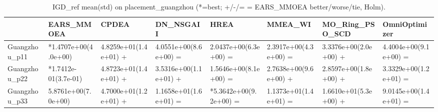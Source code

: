 \begin{table}[t]
\centering
\caption{IGD_ref mean(std) on placement_guangzhou (*=best; +/-/= = EARS_MMOEA better/worse/tie, Holm).}
\label{tab:placement_guangzhou_IGD_ref}
\begin{tabular}{llllllll}
\toprule
 & EARS\_MMOEA & CPDEA & DN\_NSGAII & HREA & MMEA\_WI & MO\_Ring\_PSO\_SCD & OmniOptimizer \\
\midrule
Guangzhou\_p11 & *1.4707e+00(4.0e+00) & 4.8259e+01(1.4e+01) + & 4.0551e+00(8.6e+00) = & 2.0437e+00(6.3e+00) = & 2.3917e+00(4.3e+00) = & 3.3376e+00(2.0e+00) + & 4.4004e+00(9.1e+00) = \\
Guangzhou\_p22 & *1.7412e-01(3.7e-01) & 4.8723e+01(1.4e+01) + & 3.5316e+00(1.1e+01) + & 1.5646e+00(8.1e+00) = & 2.7638e+00(9.6e+00) + & 2.8597e+00(1.8e+00) + & 3.3329e+00(1.2e+01) = \\
Guangzhou\_p33 & 5.8761e+00(7.0e+00) & 4.7000e+01(1.2e+01) + & 1.1658e+01(1.6e+01) = & *5.3642e+00(9.2e+00) = & 1.1373e+01(1.4e+01) = & 1.6610e+01(5.3e+00) + & 9.0145e+00(1.4e+01) = \\
\bottomrule
\end{tabular}
\end{table}
